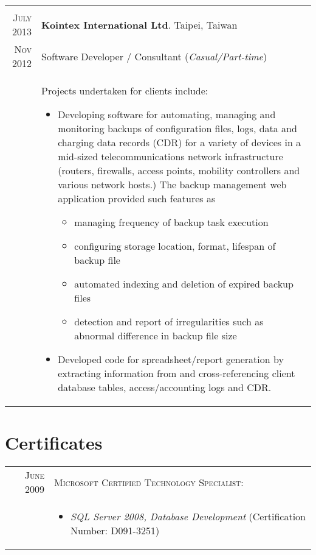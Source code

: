 \documentclass[a4paper,10pt]{article} %
\begin{document}
\begin{longtable}{r|p{13.8cm}}
  \multicolumn{2}{c}{}\\

  \newpage
  
  \textsc{July 2013} & \textbf{Kointex International Ltd}.  \hfill Taipei, Taiwan\\
  \textsc{Nov 2012}  & Software Developer / Consultant      \hfill (\emph{Casual/Part-time})\\
  & \footnotesize{
      Projects undertaken for clients include:
      \begin{itemize}
        \item Developing software for automating, managing and monitoring backups of 
          configuration files, logs, data and charging data records (CDR) for a variety of 
          devices in a mid-sized telecommunications network infrastructure (routers, firewalls, 
          access points, mobility controllers and various network hosts.)
          The backup management web application provided such features as 
          \begin{itemize}
            \item managing frequency of backup task execution
            \item configuring storage location, format, lifespan of backup file
            \item automated indexing and deletion of expired backup files
            \item detection and report of irregularities such as abnormal difference 
              in backup file size 
          \end{itemize}
        \item Developed code for spreadsheet/report generation by extracting information 
          from and cross-referencing client database tables, access/accounting logs and CDR.
      \end{itemize}
    }
\end{longtable}


\section{Certificates}

\begin{tabular}{rl}

\textsc{June} 2009 	&\textsc{Microsoft Certified Technology Specialist:} \\ 
				& \parbox{0.9\textwidth}{
				\begin{itemize}
				\item	\emph{SQL Server 2008, Database Development} (Certification Number: D091-3251)
				\end{itemize}
				 }

\end{tabular}
\end{document}
